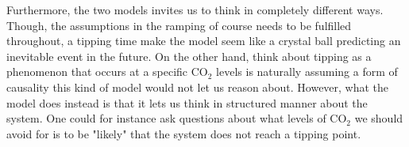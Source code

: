 Furthermore, the two models invites us to think in completely different ways. Though, the assumptions in the ramping of course needs to be fulfilled throughout, a tipping time make the model seem like a crystal ball predicting an inevitable event in the future. On the other hand, think about tipping as a phenomenon that occurs at a specific $\mathrm{CO}_2$ levels is naturally assuming a form of causality this kind of model would not let us reason about. However, what the model does instead is that it lets us think in structured manner about the system. One could for instance ask questions about what levels of $\mathrm{CO}_2$ we should avoid for is to be "likely" that the system does not reach a tipping point. 